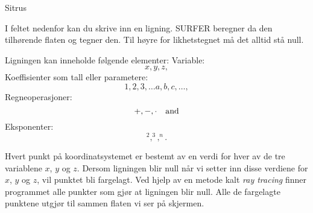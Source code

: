 \documentclass[no]{./../../common/SurferDesc}%
\begin{document}
\footnotesize
%
\begin{surferPage}
  \begin{surferTitle}Sitrus \end{surferTitle}   %
I feltet nedenfor kan du skrive inn en ligning. SURFER beregner da den tilhørende flaten og tegner den. 
Til høyre for likhetstegnet må det alltid stå null. 

Ligningen kan inneholde følgende elementer:
\newline
Variable:
\[x, y, z, \]
Koeffisienter som tall eller parametere:
\[1, 2, 3, \dots a, b, c, \dots, \]
Regneoperasjoner:
\[+,  - , \cdot \quad \textnormal{and} \]
Eksponenter:
\[ ^2, ^3, ^n .\]

Hvert punkt på koordinatsystemet er bestemt av en verdi for hver av de tre variablene $x$, $y$ og $z$. 
Dersom ligningen blir null når vi setter inn disse verdiene for $x$, $y$ og $z$, vil punktet bli fargelagt. 
Ved hjelp av en metode kalt \textit{ray tracing} finner programmet alle punkter som gjør at ligningen blir null. 
Alle de fargelagte punktene utgjør til sammen flaten vi ser på skjermen. 
  
  \begin{surferText}
     \end{surferText}
\end{surferPage}


\end{document}
